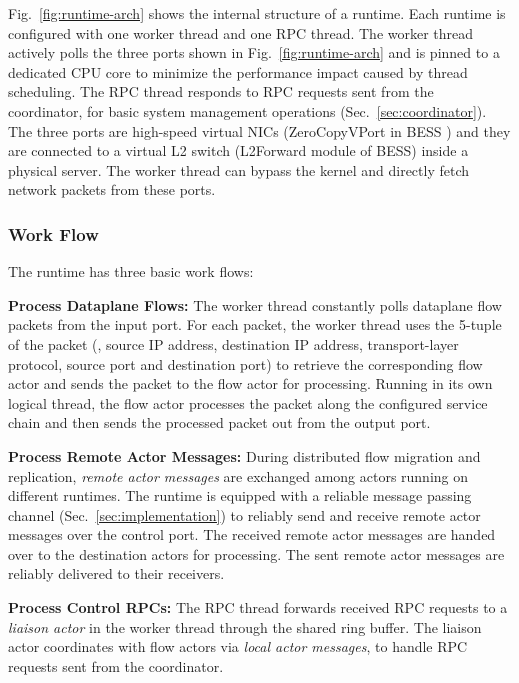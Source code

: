 Fig.~\ref{fig:runtime-arch} shows the internal structure of a runtime. Each runtime is configured with one worker thread and one RPC thread. The worker thread actively polls the three ports shown in Fig.~\ref{fig:runtime-arch} and is pinned to a dedicated CPU core to minimize the performance impact caused by thread scheduling. The RPC thread responds to RPC requests sent from the coordinator, for basic system management operations (Sec.~\ref{sec:coordinator}). The three ports are high-speed virtual NICs (ZeroCopyVPort in BESS \cite{bess}) and they are connected to a virtual L2 switch (L2Forward module of BESS) inside a physical server. The worker thread can bypass the kernel and directly fetch network packets from these ports.

\subsubsection{Work Flow}

The runtime has three basic work flows:

\noindent \textbf{Process Dataplane Flows:} The worker thread constantly polls dataplane flow packets from the input port. For each packet, the worker thread uses the 5-tuple of the packet (\ie, source IP address, destination IP address, transport-layer protocol, source port and destination port) to retrieve the corresponding flow actor and sends the packet to the flow actor for processing. Running in its own logical thread, the flow actor processes the packet along the configured service chain and then sends the processed packet out from the output port.

\noindent \textbf{Process Remote Actor Messages:} During distributed flow migration and replication, {\em remote actor messages} are exchanged among actors running on different runtimes. The runtime is equipped with a reliable message passing channel (Sec.~\ref{sec:implementation}) to reliably send and receive remote actor messages over the control port. The received remote actor messages are handed over to the destination actors for processing. The sent remote actor messages are reliably delivered to their receivers.

\noindent \textbf{Process Control RPCs:} The RPC thread forwards received RPC requests to a {\em liaison actor} in the worker thread through the shared ring buffer. The liaison actor coordinates with flow actors via {\em local actor messages}, to handle RPC requests sent from the coordinator.


